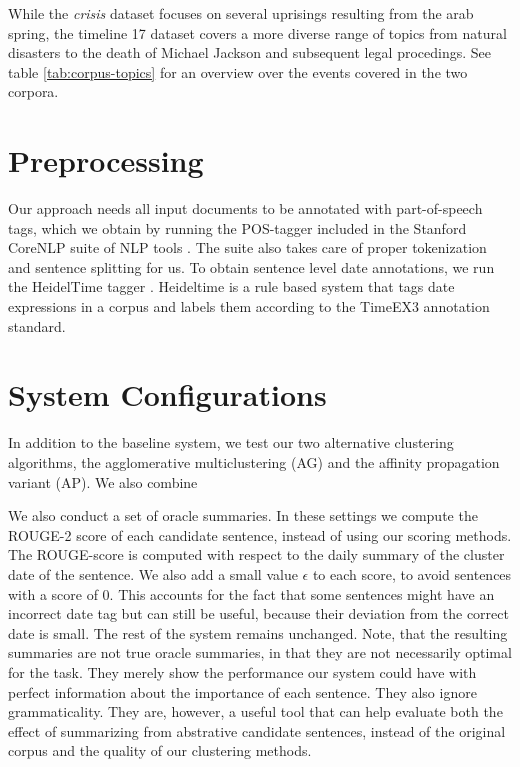 \documentclass[a4paper,BCOR=10mm]{report}
\numberwithin{lemma}{chapter}
\numberwithin{definition}{chapter}
\begin{document}
While the \textit{crisis} dataset focuses on several uprisings resulting from the arab spring, the timeline 17 dataset covers a more diverse range of topics from natural disasters to the death of Michael Jackson and subsequent legal procedings. See table \ref{tab:corpus-topics} for an overview over the events covered in the two corpora.

\section{Preprocessing}

Our approach needs all input documents to be annotated with part-of-speech tags, which we obtain by running the POS-tagger included in the Stanford CoreNLP suite of NLP tools \citep{stanford-corenlp}. The suite also takes care of proper tokenization and sentence splitting for us.
To obtain sentence level date annotations, we run the HeidelTime tagger \citet{heideltime}. Heideltime is a rule based system that tags date expressions in a corpus and labels them according to the TimeEX3 annotation standard.

\section{System Configurations}

In addition to the baseline system, we test our two alternative clustering algorithms, the agglomerative multiclustering (AG) and the affinity propagation variant (AP).
We also combine 

We also conduct a set of oracle summaries. In these settings we compute the ROUGE-2 score of each candidate sentence, instead of using our scoring methods. The ROUGE-score is computed with respect to the daily summary of the cluster date of the sentence. We also add a small value $\epsilon$ to each score, to avoid sentences with a score of 0. This accounts for the fact that some sentences might have an incorrect date tag but can still be useful, because their deviation from the correct date is small. The rest of the system remains unchanged. Note, that the resulting summaries are not true oracle summaries, in that they are not necessarily optimal for the task. They merely show the performance our system could have with perfect information about the importance of each sentence. They also ignore grammaticality.
They are, however, a useful tool that can help evaluate both the effect of summarizing from abstrative candidate sentences, instead of the original corpus and the quality of our clustering methods.
\end{document}
